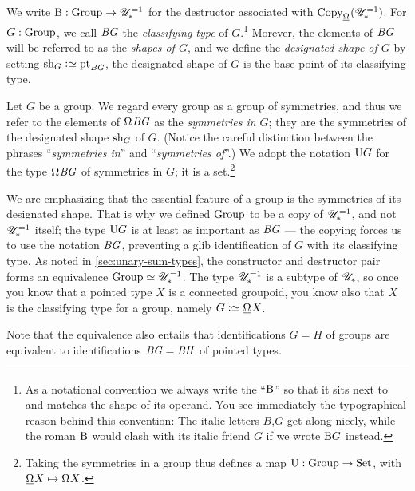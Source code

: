 \begin{definition}\label{def:classifying-type}
  We write $\mathrm{B} : \mathrm{Group} \to {\mathscr{U}}_\ast^{=1}$ for the
  destructor associated with $\Copy_{\mkgroup}(\UUscone)$.
  For $G : \mathrm{Group}$,
  we call $\mathit{B}\mathit{G}$ the \emph{classifying type} of $G$.\footnote{%
    As a notational convention we always write the ``$\mathrm{B}$''
    so that it sits next to and matches the shape
    of its operand.
    You see immediately the typographical reason behind this convention:
    The italic letters $B$,$G$ get along nicely,
    while the roman $\mathrm{B}$ would clash with its italic friend $G$
    if we wrote $\mathrm{B} G$ instead.} %
  Morever, the elements of $\mathit{B}\mathit{G}$ will be referred to as the \emph{shapes of $G$},
  and we define the \emph{designated shape of $G$} by setting
  $\sh_G\defequi \pt_{\BG}$,
  \ie the designated shape of $G$ is the base point of its
  classifying type.
\end{definition}

\begin{definition}\label{def:group-symmetries}%
  Let $G$ be a group.
  We regard every group as a group of symmetries,
  and thus we refer to the elements of $\loops \BG$ as the
  \emph{symmetries in $G$};
  they are the symmetries of the designated shape $\mathrm{sh}_G$ of $G$.
  (Notice the careful distinction between the phrases
  ``\emph{symmetries in}'' and ``\emph{symmetries of}''.)
  We adopt the notation $\mathrm{U} G$ for the type $\loops \BG$ of symmetries in $G$;
  it is a set.\footnote{%
    Taking the symmetries in a group
    thus defines a map
    $\mathrm{U} : \mathrm{Group} \to \mathrm{Set}$,
    with $\mkgroup X \mapsto \loops X$.}
\end{definition}

\begin{remark}\label{rem:aut}
  We are emphasizing that the essential feature of a group
  is the symmetries of its designated shape.
  That is why we defined $\mathrm{Group}$ to be a copy of ${\mathscr{U}}_\ast^{=1}$,
  and not ${\mathscr{U}}_\ast^{=1}$ itself;
  the type $\mathrm{U} G$ is at least as important as $\mathit{B}\mathit{G}$
  --- the copying forces us to use the notation $\mathit{B}\mathit{G}$,
  preventing a glib identification of $G$ with its classifying type.
  As noted in \cref{sec:unary-sum-types},
  the constructor and destructor pair forms an equivalence $\mathrm{Group} \simeq {\mathscr{U}}_\ast^{=1}$.
  The type ${\mathscr{U}}_\ast^{=1}$ is a subtype of ${\mathscr{U}_*}$, so 
  once you know that a pointed type $X$ is a connected groupoid,
  you know also that $X$ is the classifying type for a group,
  namely $G\defeq\mkgroup X$.

  Note that the equivalence also entails
  that identifications $G=H$ of groups are equivalent
  to identifications $\mathit{B}\mathit{G} = \mathit{B}\mathit{H}$ of pointed types.
\end{remark}

